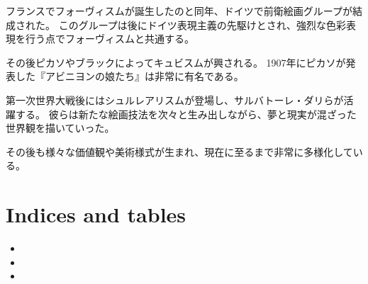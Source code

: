 \documentclass[letterpaper,10pt,dvipdfmx]{sphinxmanual}
\begin{document}
フランスでフォーヴィスムが誕生したのと同年、ドイツで前衛絵画グループが結成された。
このグループは後にドイツ表現主義の先駆けとされ、強烈な色彩表現を行う点でフォーヴィスムと共通する。

その後ピカソやブラックによってキュビスムが興される。
1907年にピカソが発表した『アビニヨンの娘たち』は非常に有名である。

第一次世界大戦後にはシュルレアリスムが登場し、サルバトーレ・ダリらが活躍する。
彼らは新たな絵画技法を次々と生み出しながら、夢と現実が混ざった世界観を描いていった。

その後も様々な価値観や美術様式が生まれ、現在に至るまで非常に多様化している。


\chapter{Indices and tables}
\label{\detokenize{index:indices-and-tables}}\begin{itemize}
\item {} 

\item {} 

\item {} 

\end{itemize}



\renewcommand{\indexname}{索引}
\printindex
\end{document}
